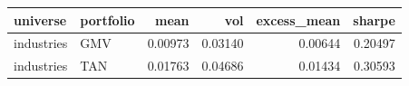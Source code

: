 \begin{tabular}{llrrrr}
\toprule
universe & portfolio & mean & vol & excess\_mean & sharpe \\
\midrule
industries & GMV & 0.00973 & 0.03140 & 0.00644 & 0.20497 \\
industries & TAN & 0.01763 & 0.04686 & 0.01434 & 0.30593 \\
\bottomrule
\end{tabular}
